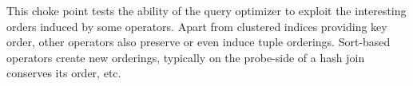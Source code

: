 
This choke point tests the ability of the query optimizer to exploit the
interesting orders induced by some operators. Apart from clustered indices
providing key order, other operators also preserve or even induce tuple
orderings. Sort-based operators create new orderings, typically on the probe-side
of a hash join conserves its order, etc.


